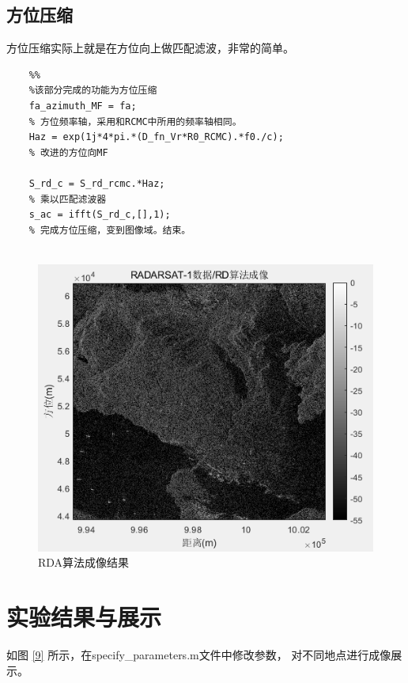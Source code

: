 \documentclass{article}
\begin{document}
\subsection{方位压缩}
方位压缩实际上就是在方位向上做匹配滤波，非常的简单。
\begin{lstlisting}
	%%
	%该部分完成的功能为方位压缩
	fa_azimuth_MF = fa;         
	% 方位频率轴，采用和RCMC中所用的频率轴相同。
	Haz = exp(1j*4*pi.*(D_fn_Vr*R0_RCMC).*f0./c);   
	% 改进的方位向MF
	
	S_rd_c = S_rd_rcmc.*Haz;            
	% 乘以匹配滤波器
	s_ac = ifft(S_rd_c,[],1);       	
	% 完成方位压缩，变到图像域。结束。
	
\end{lstlisting}


\begin{figure}[H] %
	\centering
	\includegraphics[scale=1]{8.png}
	\caption{RDA算法成像结果}
	\label{8}
\end{figure}

\section{实验结果与展示}
如图 \ref{9} 所示，在specify\_parameters.m文件中修改参数，
对不同地点进行成像展示。
\end{document}
